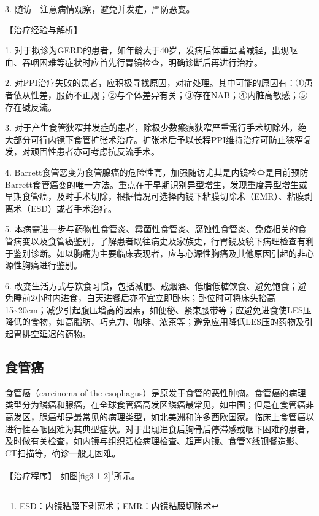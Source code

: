 3. 随访　注意病情观察，避免并发症，严防恶变。

【治疗经验与解析】

1.
对于拟诊为GERD的患者，如年龄大于40岁，发病后体重显著减轻，出现呕血、吞咽困难等症状时应首先行胃镜检查，明确诊断后再进行治疗。

2.
对PPI治疗失败的患者，应积极寻找原因，对症处理。其中可能的原因有：①患者依从性差，服药不正规；②与个体差异有关；③存在NAB；④内脏高敏感；⑤存在碱反流。

3.
对于产生食管狭窄并发症的患者，除极少数瘢痕狭窄严重需行手术切除外，绝大部分可行内镜下食管扩张术治疗。扩张术后予以长程PPI维持治疗可防止狭窄复发，对顽固性患者亦可考虑抗反流手术。

4.
Barrett食管恶变为食管腺癌的危险性高，加强随访尤其是内镜检查是目前预防Barrett食管癌变的唯一方法。重点在于早期识别异型增生，发现重度异型增生或早期食管癌，及时手术切除，根据情况可选择内镜下粘膜切除术（EMR）、粘膜剥离术（ESD）或者手术治疗。

5.
本病需进一步与药物性食管炎、霉菌性食管炎、腐蚀性食管炎、免疫相关的食管病变以及食管癌鉴别，了解患者既往病史及家族史，行胃镜及镜下病理检查有利于鉴别诊断。如以胸痛为主要临床表现者，应与心源性胸痛及其他原因引起的非心源性胸痛进行鉴别。

6.
改变生活方式与饮食习惯，包括减肥、戒烟酒、低脂低糖饮食、避免饱食；避免睡前2小时内进食，白天进餐后亦不宜立即卧床；卧位时可将床头抬高15\textasciitilde{}20cm；减少引起腹压增高的因素，如便秘、紧束腰带等；应避免进食使LES压降低的食物，如高脂肪、巧克力、咖啡、浓茶等；避免应用降低LES压的药物及引起胃排空延迟的药物。


\subsection{食管癌}

食管癌（carcinoma of the
esophagus）是原发于食管的恶性肿瘤。食管癌的病理类型分为鳞癌和腺癌，在全球食管癌高发区鳞癌最常见，如中国；但是在食管癌非高发区，腺癌却是最常见的病理类型，如北美洲和许多西欧国家。临床上食管癌以进行性吞咽困难为其典型症状。对于出现进食后胸骨后停滞感或咽下困难的患者，及时做有关检查，如内镜与组织活检病理检查、超声内镜、食管X线钡餐造影、CT扫描等，确诊一般无困难。

【治疗程序】　如图\ref{fig3-1-2}\footnote{ESD：内镜粘膜下剥离术；EMR：内镜粘膜切除术}所示。

